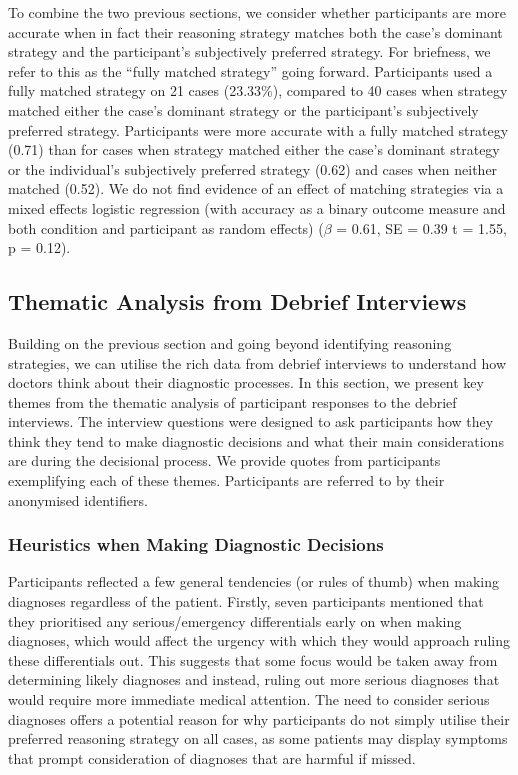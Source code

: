 \documentclass[a4paper, nobind]{templates/ociamthesis}
\begin{document}
To combine the two previous sections, we consider whether participants are more accurate when in fact their reasoning strategy matches both the case's dominant strategy and the participant's subjectively preferred strategy. For briefness, we refer to this as the ``fully matched strategy'' going forward. Participants used a fully matched strategy on 21 cases (23.33\%), compared to 40 cases when strategy matched either the case's dominant strategy or the participant's subjectively preferred strategy. Participants were more accurate with a fully matched strategy (0.71) than for cases when strategy matched either the case's dominant strategy or the individual's subjectively preferred strategy (0.62) and cases when neither matched (0.52). We do not find evidence of an effect of matching strategies via a mixed effects logistic regression (with accuracy as a binary outcome measure and both condition and participant as random effects) (\(\beta\) = 0.61, SE = 0.39 t = 1.55, p = 0.12).

\subsection{Thematic Analysis from Debrief Interviews}\label{thematic-analysis-from-debrief-interviews}

Building on the previous section and going beyond identifying reasoning strategies, we can utilise the rich data from debrief interviews to understand how doctors think about their diagnostic processes. In this section, we present key themes from the thematic analysis of participant responses to the debrief interviews. The interview questions were designed to ask participants how they think they tend to make diagnostic decisions and what their main considerations are during the decisional process. We provide quotes from participants exemplifying each of these themes. Participants are referred to by their anonymised identifiers.

\subsubsection{Heuristics when Making Diagnostic Decisions}\label{heuristics-when-making-diagnostic-decisions}

Participants reflected a few general tendencies (or rules of thumb) when making diagnoses regardless of the patient. Firstly, seven participants mentioned that they prioritised any serious/emergency differentials early on when making diagnoses, which would affect the urgency with which they would approach ruling these differentials out. This suggests that some focus would be taken away from determining likely diagnoses and instead, ruling out more serious diagnoses that would require more immediate medical attention. The need to consider serious diagnoses offers a potential reason for why participants do not simply utilise their preferred reasoning strategy on all cases, as some patients may display symptoms that prompt consideration of diagnoses that are harmful if missed.\\
\end{document}
